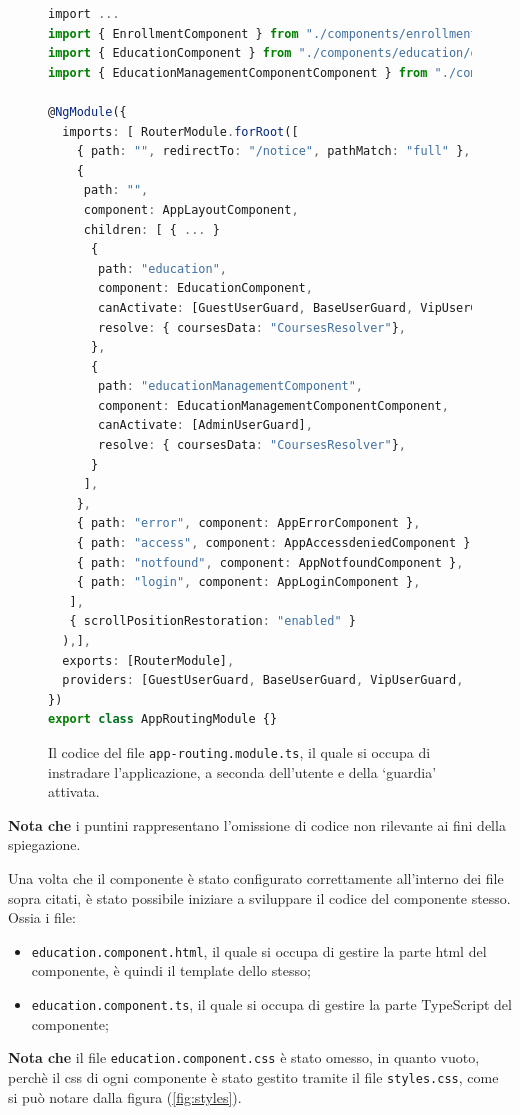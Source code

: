 \begin{figure}[H]
\centering
\begin{lstlisting}[language=TypeScript, linewidth=20cm, basicstyle=\tiny]
import ...
import { EnrollmentComponent } from "./components/enrollment/enrollment.component";
import { EducationComponent } from "./components/education/education.component";
import { EducationManagementComponentComponent } from "./components/admin/educationManagementComponent/  educationManagementComponent.component";

@NgModule({
  imports: [ RouterModule.forRoot([
    { path: "", redirectTo: "/notice", pathMatch: "full" },
    {
     path: "",
     component: AppLayoutComponent,
     children: [ { ... }
      {
       path: "education",
       component: EducationComponent,
       canActivate: [GuestUserGuard, BaseUserGuard, VipUserGuard, AdminUserGuard],
       resolve: { coursesData: "CoursesResolver"},
      },
      {
       path: "educationManagementComponent",
       component: EducationManagementComponentComponent,
       canActivate: [AdminUserGuard],
       resolve: { coursesData: "CoursesResolver"},
      }
     ],
    },
    { path: "error", component: AppErrorComponent },
    { path: "access", component: AppAccessdeniedComponent },
    { path: "notfound", component: AppNotfoundComponent },
    { path: "login", component: AppLoginComponent },
   ],
   { scrollPositionRestoration: "enabled" }
  ),],
  exports: [RouterModule],
  providers: [GuestUserGuard, BaseUserGuard, VipUserGuard,   AdminUserGuard],
})
export class AppRoutingModule {}
\end{lstlisting}
\caption{\label{fig:app.routing}Il codice del file \texttt{app-routing.module.ts}, il quale si occupa di instradare l'applicazione, a seconda dell'utente e della `guardia' attivata.}
\end{figure}
\textbf{Nota che } i puntini rappresentano l'omissione di codice non rilevante ai fini della spiegazione.\newline

Una volta che il componente è stato configurato correttamente all'interno dei file sopra citati, è stato possibile iniziare a sviluppare il codice del componente stesso. Ossia i file:
\begin{itemize}
  \item \texttt{education.component.html}, il quale si occupa di gestire la parte \acrshort{html} del componente, è quindi il template dello stesso;
  \item \texttt{education.component.ts}, il quale si occupa di gestire la parte TypeScript del componente;
\end{itemize}
\textbf{Nota che } il file \texttt{education.component.css} è stato omesso, in quanto vuoto, perchè il \acrshort{css} di ogni componente è stato gestito tramite il file \texttt{styles.css}, come si può notare dalla figura (\ref{fig:styles}).\newline


